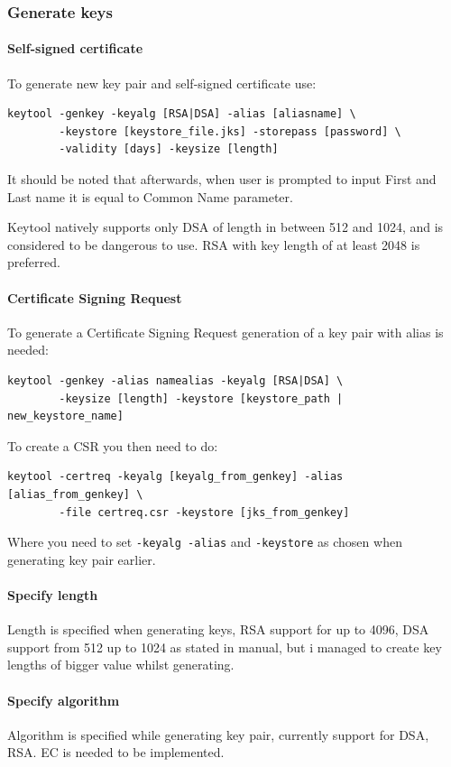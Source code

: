 \documentclass[10pt, a4paper]{report}
\begin{document}
    \subsubsection{Generate keys}
    
      \paragraph{Self-signed certificate}
To generate new key pair and self-signed certificate use:
\begin{verbatim}
keytool -genkey -keyalg [RSA|DSA] -alias [aliasname] \
        -keystore [keystore_file.jks] -storepass [password] \
        -validity [days] -keysize [length]
\end{verbatim}

It should be noted that afterwards, when user is prompted to input First and Last name it is equal to Common Name parameter.

Keytool natively supports only DSA of length in between 512 and 1024, and is considered to be dangerous to use. RSA with key length of at least 2048 is preferred.

      \paragraph{Certificate Signing Request}
To generate a Certificate Signing Request generation of a key pair with alias is needed:
\begin{verbatim}
keytool -genkey -alias namealias -keyalg [RSA|DSA] \
        -keysize [length] -keystore [keystore_path | new_keystore_name]
\end{verbatim}
To create a CSR you then need to do:
\begin{verbatim}
keytool -certreq -keyalg [keyalg_from_genkey] -alias [alias_from_genkey] \
        -file certreq.csr -keystore [jks_from_genkey]
\end{verbatim}
Where you need to set \verb+-keyalg -alias+ and \verb+-keystore+ as chosen when generating key pair earlier.

      \paragraph{Specify length}
Length is specified when generating keys, RSA support for up to 4096, DSA support from 512 up to 1024 as stated in manual, but i managed to create key lengths of bigger value whilst generating.

      \paragraph{Specify algorithm}
Algorithm is specified while generating key pair, currently support for DSA, RSA. EC is needed to be implemented.      
\end{document}
